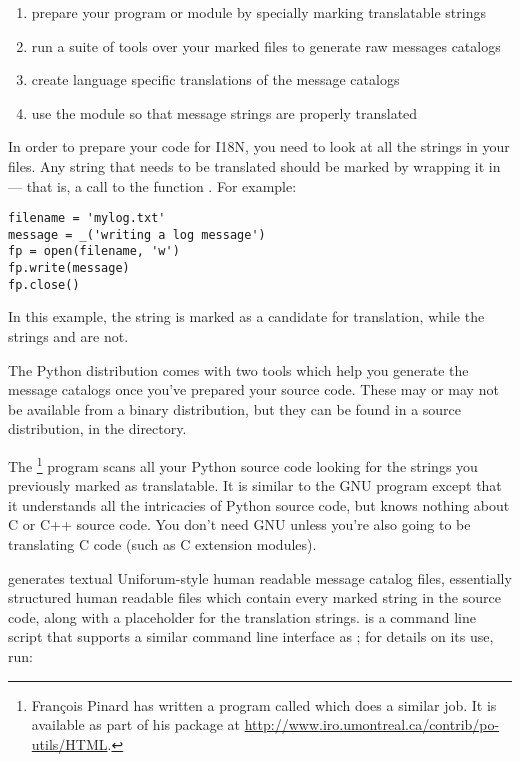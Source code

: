 \begin{enumerate}
    \item prepare your program or module by specially marking
          translatable strings
    \item run a suite of tools over your marked files to generate raw
          messages catalogs
    \item create language specific translations of the message catalogs
    \item use the  module so that message strings are
          properly translated
\end{enumerate}

In order to prepare your code for I18N, you need to look at all the
strings in your files.  Any string that needs to be translated
should be marked by wrapping it in  --- that is, a call
to the function \function{_()}.  For example:

\begin{verbatim}
filename = 'mylog.txt'
message = _('writing a log message')
fp = open(filename, 'w')
fp.write(message)
fp.close()
\end{verbatim}

In this example, the string  is marked as
a candidate for translation, while the strings  and
 are not.

The Python distribution comes with two tools which help you generate
the message catalogs once you've prepared your source code.  These may
or may not be available from a binary distribution, but they can be
found in a source distribution, in the  directory.

The \footnote{Fran\c cois Pinard has
written a program called
 which does a similar job.  It is available as part of
his  package at
\url{http://www.iro.umontreal.ca/contrib/po-utils/HTML}.} program
scans all your Python source code looking for the strings you
previously marked as translatable.  It is similar to the GNU
 program except that it understands all the
intricacies of Python source code, but knows nothing about C or C++
source code.  You don't need GNU  unless you're also
going to be translating C code (such as C extension modules).

 generates textual Uniforum-style human readable
message catalog  files, essentially structured human
readable files which contain every marked string in the source code,
along with a placeholder for the translation strings.
 is a command line script that supports a similar
command line interface as ; for details on its use,
run:


